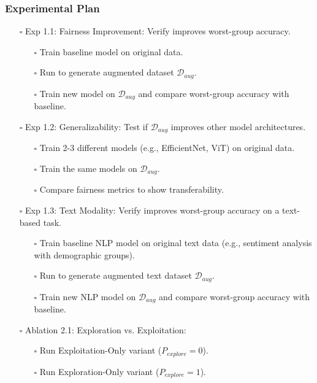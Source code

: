 
\subsubsection*{Experimental Plan}
\begin{itemize}
    \item[$\square$] Exp 1.1: Fairness Improvement: Verify \system improves worst-group accuracy.
    \begin{itemize}
        \item[$\square$] Train baseline model on original data.
        \item[$\square$] Run \system to generate augmented dataset $\mathcal{D}_{aug}$.
        \item[$\square$] Train new model on $\mathcal{D}_{aug}$ and compare worst-group accuracy with baseline.
    \end{itemize}
    \item[$\square$] Exp 1.2: Generalizability: Test if $\mathcal{D}_{aug}$ improves other model architectures.
    \begin{itemize}
        \item[$\square$] Train 2-3 different models (e.g., EfficientNet, ViT) on original data.
        \item[$\square$] Train the same models on $\mathcal{D}_{aug}$.
        \item[$\square$] Compare fairness metrics to show transferability.
    \end{itemize}
    \item[$\square$] Exp 1.3: Text Modality: Verify \system improves worst-group accuracy on a text-based task.
    \begin{itemize}
        \item[$\square$] Train baseline NLP model on original text data (e.g., sentiment analysis with demographic groups).
        \item[$\square$] Run \system to generate augmented text dataset $\mathcal{D}_{aug}$.
        \item[$\square$] Train new NLP model on $\mathcal{D}_{aug}$ and compare worst-group accuracy with baseline.
    \end{itemize}
    \item[$\square$] Ablation 2.1: Exploration vs. Exploitation:
    \begin{itemize}
        \item[$\square$] Run Exploitation-Only variant ($P_{explore}=0$).
        \item[$\square$] Run Exploration-Only variant ($P_{explore}=1$).

\end{itemize}
\end{itemize}
